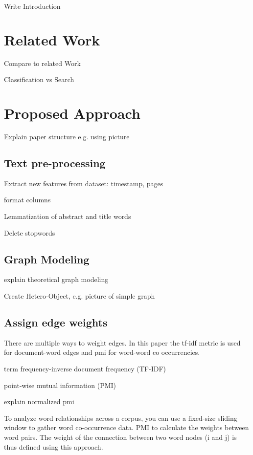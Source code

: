 \documentclass[twocolumn]{webofc}
\begin{document}
Write Introduction

\section{Related Work}\label{sec:fig-tables}

Compare to related Work \cite[p.~X]{Yao19} \cite[p.~XX]{Han22}

Classification vs Search

\section{Proposed Approach}\label{sec:equat-math}

Explain paper structure e.g. using picture


\subsection{Text pre-processing}

Extract new features from dataset: timestamp, pages

format columns

Lemmatization of abstract and title words

Delete stopwords


\subsection{Graph Modeling}

explain theoretical graph modeling

Create Hetero-Object, e.g. picture of simple graph

\subsection{Assign edge weights}

There are multiple ways to weight edges. In this paper the tf-idf metric is used for document-word edges and pmi for word-word co occurrencies.

term frequency-inverse document frequency (TF-IDF) 


point-wise mutual information (PMI)

explain normalized pmi

To analyze word relationships across a corpus, you can use a fixed-size sliding window to gather word co-occurrence data. PMI to calculate the weights between word pairs. The weight of the connection between two word nodes (i and j) is thus defined using this approach.
\end{document}
